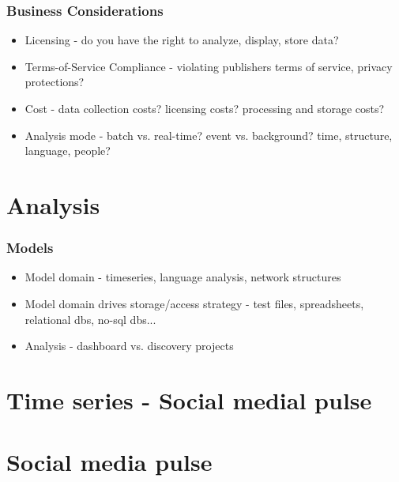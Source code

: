 \documentclass{beamer}
\begin{document}

\begin{frame}\frametitle{Business Considerations}
{\Large
\begin{itemize}
\item Licensing - do you have the right to analyze, display, store data?
\item Terms-of-Service Compliance - violating publishers terms of service, privacy protections?
\item Cost - data collection costs? licensing costs? processing and storage costs?
\item Analysis mode - batch vs. real-time? event vs. background? time, structure, language, people?
\end{itemize}
}
\end{frame}


\section{Analysis}



\begin{frame}\frametitle{Models}
\begin{itemize}
\item Model domain - timeseries, language analysis, network structures
\item Model domain drives storage/access strategy - test files, spreadsheets, relational dbs, no-sql dbs...
\item Analysis - dashboard vs. discovery projects
\end{itemize}
\end{frame}




\section{Time series - Social medial pulse}


\section{Social media pulse}

\end{document}
